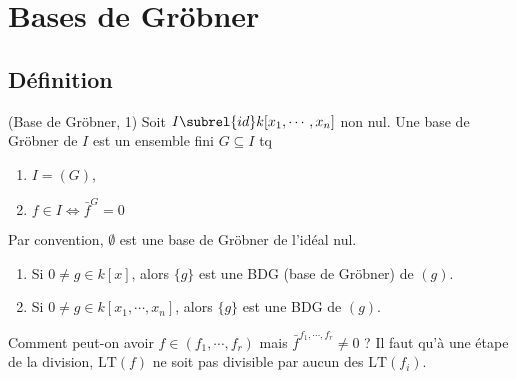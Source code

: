    \section{Bases de Gröbner}
        \subsection{Définition}
            \begin{defi} (Base de Gröbner, 1)
                \label{grob_1}
                Soit $I \subrel{id} k[x_1, \cdots, x_n]$ non nul. Une base de Gröbner de $I$ est un ensemble fini $G \subseteq I$ tq
                \begin{enumerate}
                    \item $I = (G)$,
                    \item $f \in I \iff \bar f^G = 0$
                \end{enumerate}
            \end{defi}
            Par convention, $\emptyset$ est une base de Gröbner de l'idéal nul.
            \begin{expl}
                \begin{enumerate}
                    \item Si $0 \neq g \in k[x]$, alors $\{g\}$ est une BDG (base de Gröbner) de $(g)$.
                    \item Si $0 \neq g \in k[x_1, \cdots, x_n]$, alors $\{g\}$ est une BDG de $(g)$.
                \end{enumerate}
            \end{expl}
            Comment peut-on avoir $f \in (f_1, \cdots, f_r)$ mais $\bar f^{f_1, \cdots, f_r} \neq 0$ ? Il faut qu'à une étape de la division, $\mathrm{LT}(f)$ ne soit pas divisible par aucun des $\mathrm{LT}(f_i)$. 
        
